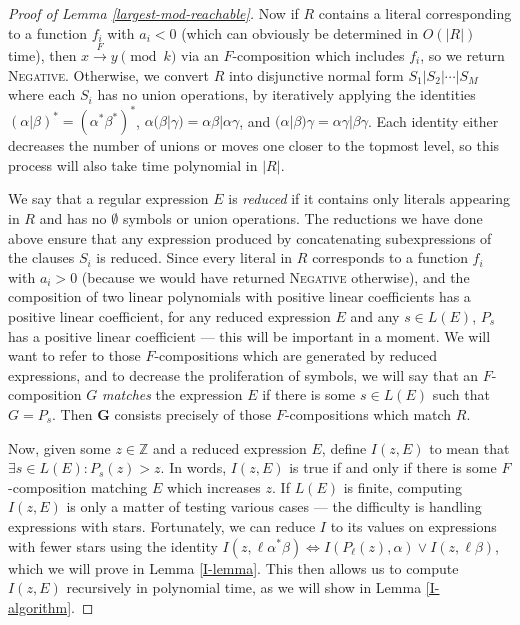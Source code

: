 \documentclass[11pt]{amsart}
\newcommand{\Z}{\mathbb{Z}}
\theoremstyle{definition}
\theoremstyle{remark}
\begin{document}
\begin{proof}[Proof of Lemma \ref{largest-mod-reachable}]
Now if $R$ contains a literal corresponding to a function $f_i$ with $a_i < 0$ (which can obviously be determined in $O(|R|)$ time), then $x \xrightarrow{F} y \pmod k$ via an $F$-composition which includes $f_i$, so we return \textsc{Negative}. Otherwise, we convert $R$ into disjunctive normal form $S_1 | S_2 | \cdots | S_M$ where each $S_i$ has no union operations, by iteratively applying the identities $(\alpha | \beta)^* = (\alpha^* \beta^*)^*$, $\alpha (\beta | \gamma) = \alpha \beta | \alpha \gamma$, and $(\alpha | \beta) \gamma = \alpha \gamma | \beta \gamma$. Each identity either decreases the number of unions or moves one closer to the topmost level, so this process will also take time polynomial in $|R|$.

We say that a regular expression $E$ is \emph{reduced} if it contains only literals appearing in $R$ and has no $\emptyset$ symbols or union operations. The reductions we have done above ensure that any expression produced by concatenating subexpressions of the clauses $S_i$ is reduced. Since every literal in $R$ corresponds to a function $f_i$ with $a_i > 0$ (because we would have returned \textsc{Negative} otherwise), and the composition of two linear polynomials with positive linear coefficients has a positive linear coefficient, for any reduced expression $E$ and any $s \in L(E)$, $P_s$ has a positive linear coefficient --- this will be important in a moment. We will want to refer to those $F$-compositions which are generated by reduced expressions, and to decrease the proliferation of symbols, we will say that an $F$-composition $G$ \emph{matches} the expression $E$ if there is some $s \in L(E)$ such that $G = P_s$. Then $\mathbf{G}$ consists precisely of those $F$-compositions which match $R$.

Now, given some $z \in \Z$ and a reduced expression $E$, define $I(z,E)$ to mean that $\exists s \in L(E) : P_s(z) > z$. In words, $I(z,E)$ is true if and only if there is some $F$-composition matching $E$ which increases $z$. If $L(E)$ is finite, computing $I(z,E)$ is only a matter of testing various cases --- the difficulty is handling expressions with stars. Fortunately, we can reduce $I$ to its values on expressions with fewer stars using the identity $I(z, \ell \alpha^* \beta) \iff I(P_\ell(z), \alpha) \lor I(z, \ell \beta)$, which we will prove in Lemma \ref{I-lemma}. This then allows us to compute $I(z,E)$ recursively in polynomial time, as we will show in Lemma \ref{I-algorithm}.


\end{proof}
\end{document}
